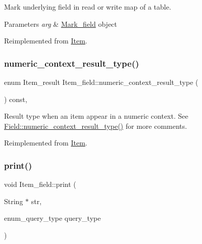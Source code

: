 Mark underlying field in read or write map of a table.


\begin{DoxyParams}{Parameters}
{\em arg} & \mbox{\hyperlink{classMark__field}{Mark\+\_\+field}} object \\
\hline
\end{DoxyParams}


Reimplemented from \mbox{\hyperlink{classItem_ada2ce79ccf5ef1273b9e1654448944c1}{Item}}.

\mbox{\label{classItem__field_aa456671bbffd7f807a25b1a76bd3ea54}} 
\subsubsection{\texorpdfstring{numeric\+\_\+context\+\_\+result\+\_\+type()}{numeric\_context\_result\_type()}}
{\footnotesize\ttfamily enum Item\+\_\+result Item\+\_\+field\+::numeric\+\_\+context\+\_\+result\+\_\+type (\begin{DoxyParamCaption}{ }\end{DoxyParamCaption}) const\hspace{0.3cm}{\ttfamily [inline]}, {\ttfamily [virtual]}}

Result type when an item appear in a numeric context. See \mbox{\hyperlink{classField_a834475c74f6d0812dc4aa1abfc483a7f}{Field\+::numeric\+\_\+context\+\_\+result\+\_\+type()}} for more comments. 

Reimplemented from \mbox{\hyperlink{classItem_a0cd3592a280aa2306ea9abfeae3f632b}{Item}}.

\mbox{\label{classItem__field_a40b28e2bc9886f81e8ad19c64efb1408}} 
\subsubsection{\texorpdfstring{print()}{print()}}
{\footnotesize\ttfamily void Item\+\_\+field\+::print (\begin{DoxyParamCaption}\item[{String $\ast$}]{str,  }\item[{enum\+\_\+query\+\_\+type}]{query\+\_\+type }\end{DoxyParamCaption})\hspace{0.3cm}{\ttfamily [virtual]}}

